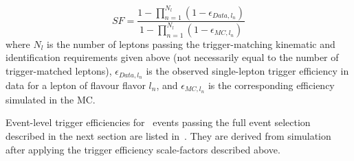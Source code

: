 \begin{equation}
\label{eq:triggerEffSF}
  SF =  { \frac{ {1 - \prod_{n=1}^{N_l} (1 - \epsilon_{Data,l_n})}} {1 - \prod_{n=1}^{N_l} (1 - \epsilon_{MC,l_n})} }
\end{equation}
where $N_l$ is the number of leptons passing the trigger-matching kinematic and
identification requirements
given above (not necessarily equal to the number of trigger-matched leptons),
$\epsilon_{Data,l_n}$ is the observed single-lepton trigger efficiency in data
for a lepton of flavour flavor $l_n$, and $\epsilon_{MC,l_n}$ is
the corresponding efficiency simulated in the MC. 

Event-level trigger efficiencies for \ZZ\ events passing the full event
selection described in the next section are listed in~. They
are derived from simulation after applying the trigger efficiency scale-factors
described above.


